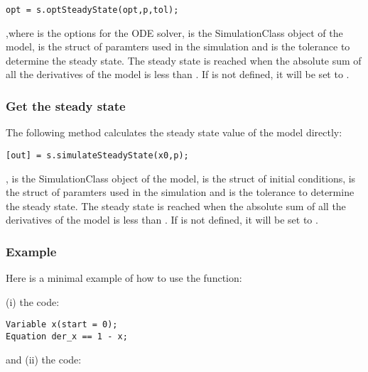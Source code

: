 \documentclass[11pt]{article}
\begin{document}
\begin{lstlisting}
opt = s.optSteadyState(opt,p,tol);
\end{lstlisting}

,where  is the options for the ODE solver,  is the SimulationClass object of the model,  is the struct of paramters used in the simulation and  is the tolerance to determine the steady state. The steady state is reached when the absolute sum of all the derivatives of the model is less than . If  is not defined, it will be set to .

\subsubsection{Get the steady state}

The following method calculates the steady state value of the model directly:

\begin{lstlisting}
[out] = s.simulateSteadyState(x0,p);
\end{lstlisting}

,  is the SimulationClass object of the model,  is the struct of initial conditions,  is the struct of paramters used in the simulation and  is the tolerance to determine the steady state. The steady state is reached when the absolute sum of all the derivatives of the model is less than . If  is not defined, it will be set to .

\subsubsection{Example}

Here is a minimal example of how to use the  function:

(i) the  code:

\begin{lstlisting}
Variable x(start = 0);  
Equation der_x == 1 - x;
\end{lstlisting}

and (ii) the  code:
\end{document}
